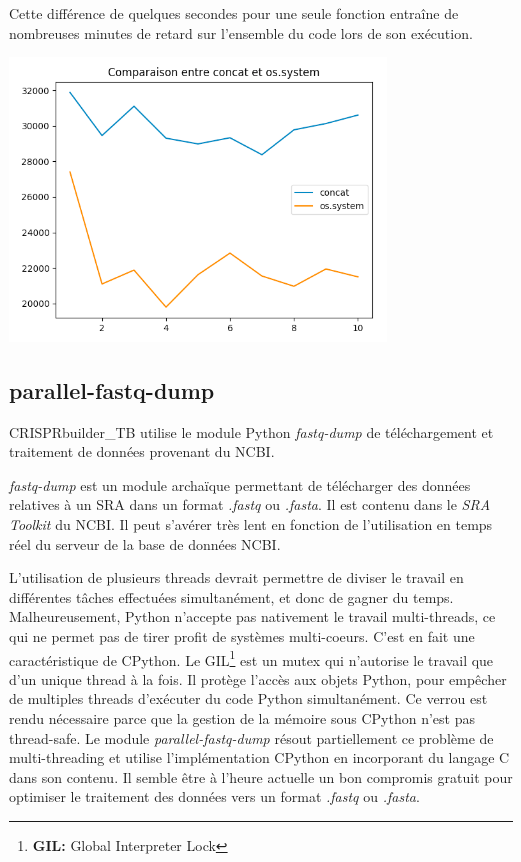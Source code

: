 \documentclass[twoside,a4paper,11pt,frenchb,openany]{report}
\begin{document}
Cette différence de quelques secondes pour une seule fonction entraîne de nombreuses minutes de retard sur l'ensemble du code lors de son exécution. 

\includegraphics[width=10cm]{comparaison_concat.png}





\subsection{parallel-fastq-dump}

CRISPRbuilder\_TB utilise le module Python \textit{fastq-dump} de téléchargement et traitement de données provenant du NCBI.

\textit{fastq-dump} est un module archaïque permettant de télécharger des données relatives à un SRA dans un format \textit{.fastq} ou \textit{.fasta}. Il est contenu dans le \textit{SRA Toolkit} du NCBI. Il peut s'avérer très lent en fonction de l'utilisation en temps réel du serveur de la base de données NCBI. 

L'utilisation de plusieurs threads devrait permettre de diviser le travail en différentes tâches effectuées simultanément, et donc de gagner du temps. Malheureusement, Python n'accepte pas nativement le travail multi-threads, ce qui ne permet pas de tirer profit de systèmes multi-coeurs. C'est en fait une caractéristique de CPython. Le GIL\footnote{\textbf{GIL:} Global Interpreter Lock} est un mutex qui n'autorise le travail que d'un unique thread à la fois. Il protège l'accès aux objets Python, pour empêcher de multiples threads d'exécuter du code Python simultanément. Ce verrou est rendu nécessaire parce que la gestion de la mémoire sous CPython n'est pas thread-safe. Le module \textit{parallel-fastq-dump} résout partiellement ce problème de multi-threading et utilise l'implémentation CPython en incorporant du langage C dans son contenu. Il semble être à l'heure actuelle un bon compromis gratuit pour optimiser le traitement des données vers un format \textit{.fastq} ou \textit{.fasta}. 
\end{document}
